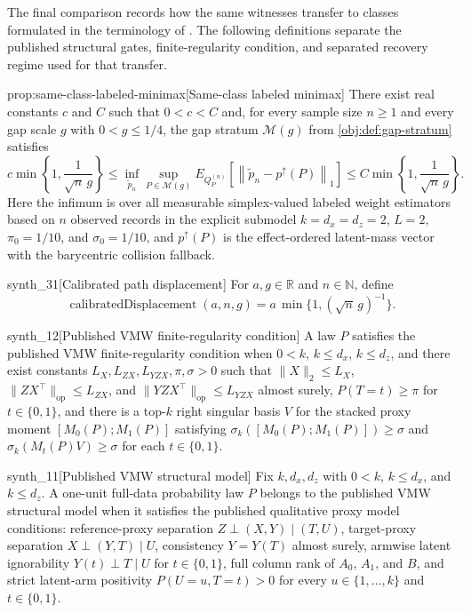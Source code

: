 The final comparison records how the same witnesses transfer to classes formulated in the terminology of \citet{VirkMazaheriWu2026}. The following definitions separate the published structural gates, finite-regularity condition, and separated recovery regime used for that transfer.

\begin{propositionv}{prop:same-class-labeled-minimax}[Same-class labeled minimax]
There exist real constants \(c\) and \(C\) such that \(0<c<C\) and, for every sample size \(n\ge 1\) and every gap scale \(g\) with \(0<g\le 1/4\), the gap stratum \(\mathcal M(g)\) from \cref{obj:def:gap-stratum} satisfies
\[
c\min\left\{1,\frac{1}{\sqrt n\,g}\right\}
\le
\inf_{\widetilde p_n}
\sup_{P\in\mathcal M(g)}
E_{Q_P^{(n)}}\!\left[
\left\|\widetilde p_n-p^{\uparrow}(P)\right\|_1
\right]
\le
C\min\left\{1,\frac{1}{\sqrt n\,g}\right\}.
\]
Here the infimum is over all measurable simplex-valued labeled weight estimators based on \(n\) observed records in the explicit submodel \(k=d_x=d_z=2\), \(L=2\), \(\pi_0=1/10\), and \(\sigma_0=1/10\), and \(p^{\uparrow}(P)\) is the effect-ordered latent-mass vector with the barycentric collision fallback.
\end{propositionv}

\begin{definitionv}{synth_31}[Calibrated path displacement]
For \(a,g\in\mathbb R\) and \(n\in\mathbb N\), define
\[
\operatorname{calibratedDisplacement}(a,n,g)
=
a\,\min\{1,(\sqrt n\,g)^{-1}\}.
\]
\end{definitionv}

\begin{definitionv}{synth_12}[Published VMW finite-regularity condition]
A law \(P\) satisfies the published VMW finite-regularity condition when \(0<k\), \(k\le d_x\), \(k\le d_z\), and there exist constants \(L_X,L_{ZX},L_{YZX},\pi,\sigma>0\) such that \(\lVert X\rVert_2\le L_X\), \(\lVert ZX^\top\rVert_{\mathrm{op}}\le L_{ZX}\), and \(\lVert YZX^\top\rVert_{\mathrm{op}}\le L_{YZX}\) almost surely, \(P(T=t)\ge\pi\) for \(t\in\{0,1\}\), and there is a top-\(k\) right singular basis \(V\) for the stacked proxy moment \([M_0(P);M_1(P)]\) satisfying \(\sigma_k([M_0(P);M_1(P)])\ge\sigma\) and \(\sigma_k(M_t(P)V)\ge\sigma\) for each \(t\in\{0,1\}\).
\end{definitionv}

\begin{definitionv}{synth_11}[Published VMW structural model]
Fix \(k,d_x,d_z\) with \(0<k\), \(k\le d_x\), and \(k\le d_z\). A one-unit full-data probability law \(P\) belongs to the published VMW structural model when it satisfies the published qualitative proxy model conditions: reference-proxy separation \(Z\perp (X,Y)\mid(T,U)\), target-proxy separation \(X\perp (Y,T)\mid U\), consistency \(Y=Y(T)\) almost surely, armwise latent ignorability \(Y(t)\perp T\mid U\) for \(t\in\{0,1\}\), full column rank of \(A_0\), \(A_1\), and \(B\), and strict latent-arm positivity \(P(U=u,T=t)>0\) for every \(u\in\{1,\ldots,k\}\) and \(t\in\{0,1\}\).
\end{definitionv}

